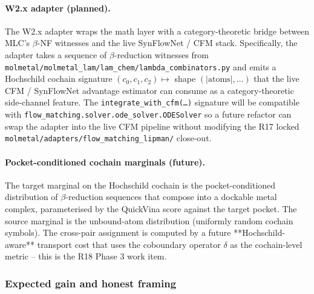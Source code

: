 \paragraph{W2.x adapter (planned).}
The W2.x adapter wraps the math layer with a category-theoretic
bridge between MLC's $\beta$-NF witnesses and the live
SynFlowNet / CFM stack.  Specifically, the adapter takes a
sequence of $\beta$-reduction witnesses from
\texttt{molmetal/molmetal\_lam/lam\_chem/lambda\_combinators.py}
and emits a Hochschild cochain signature
$(c_0, c_1, c_2) \mapsto$ shape $(|\mathrm{atoms}|, \ldots)$
that the live CFM / SynFlowNet advantage estimator can consume
as a category-theoretic side-channel feature.  The
\texttt{integrate\_with\_cfm(\dots)} signature will be compatible
with \texttt{flow\_matching.solver.ode\_solver.ODESolver} so a
future refactor can swap the adapter into the live CFM pipeline
without modifying the R17 locked
\texttt{molmetal/adapters/flow\_matching\_lipman/} close-out.

\paragraph{Pocket-conditioned cochain marginals (future).}
The target marginal on the Hochschild cochain is the
pocket-conditioned distribution of $\beta$-reduction
sequences that compose into a dockable metal complex,
parameterised by the QuickVina score against the target
pocket.  The source marginal is the unbound-atom distribution
(uniformly random cochain symbols).  The cross-pair assignment
is computed by a future **Hochschild-aware** transport cost
that uses the coboundary operator $\delta$ as the
cochain-level metric -- this is the R18 Phase 3 work item.

\subsubsection{Expected gain and honest framing}
\label{sec:method:hochschild-expected}

